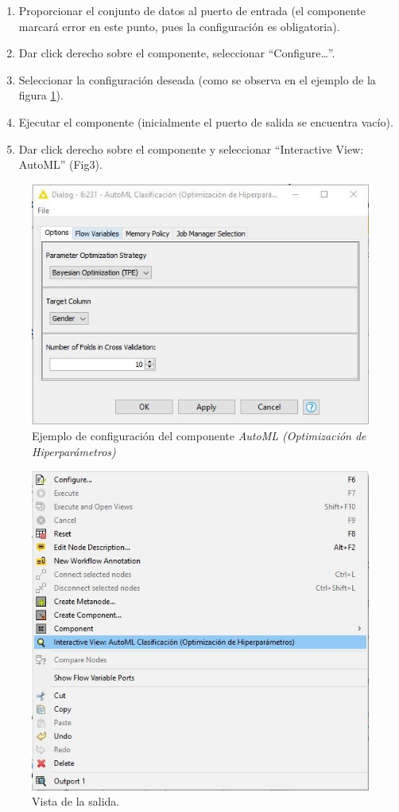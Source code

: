 \begin{enumerate}
	\item Proporcionar el conjunto de datos al puerto de entrada (el componente marcará error en este punto, pues la configuración es obligatoria).
	\item Dar click derecho sobre el componente, seleccionar “Configure…”. 
	\item Seleccionar la configuración deseada (como se observa en el ejemplo de la figura \ref{fig:config-automl-hpo}). 
	\item Ejecutar el componente (inicialmente el puerto de salida se encuentra vacío).
	\item Dar click derecho sobre el componente y seleccionar “Interactive View: AutoML” (Fig3). 
\end{enumerate}

\begin{figure}[H]
	\centering
	\includegraphics[width=0.5\linewidth]{"figuras/capi 2/config-automl-hpo"}
	\caption[Ejemplo de configuración del componente AutoML (Optimización de Hiperparámetros)]{Ejemplo de configuración del componente \textit{AutoML (Optimización de Hiperparámetros)}}
	\label{fig:config-automl-hpo}
\end{figure}

\begin{figure}[H]
	\centering
	\includegraphics[width=0.5\linewidth]{"figuras/capi 2/automl-hpo-vista-salida"}
	\caption[Vista de la salida.]{Vista de la salida.}
	\label{fig:automl-hpo-vista-salida}
\end{figure}


